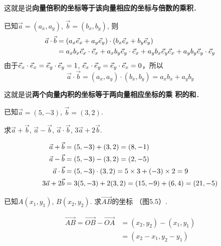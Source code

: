 这就是说\textbf{向量倍积的坐标等于该向量相应的坐标与倍数的乘积}．

已知$\vec{a}=(a_x,a_y)$, $\vec{b}=(b_x,b_y)$, 则
\[\begin{split}
    \vec{a}\cdot \vec{b}&=(a_x\vec{e}_x+a_y\vec{e}_y)\cdot (b_x\vec{e}_x+b_y\vec{e}_y)\\
    &=a_xb_x\vec{e}_x\cdot \vec{e}_x+a_xb_y\vec{e}_y\cdot \vec{e}_x+a_yb_x\vec{e}_y\vec{e}_x+a_yb_y\vec{e}_y\cdot \vec{e}_y
\end{split}\]
由于$\vec{e}_x\cdot \vec{e}_x=\vec{e}_y\cdot \vec{e}_y=1$, $\vec{e}_x\cdot \vec{e}_y=\vec{e}_y\cdot \vec{e}_x=0$，所以
\[\vec{a}\cdot \vec{b}=(a_x,a_y)\cdot (b_x,b_y)=a_xb_x+a_yb_y\]

这就是说\textbf{两个向量内积的坐标等于两向量相应坐标的乘
积的和}．

\begin{example}
    已知$\vec{a}=(5,-3)$, $\vec{b}=(3,2)$.

求$\vec{a}+\vec{b}$, $\vec{a}-\vec{b}$, $\vec{a}\cdot \vec{b}$, $3\vec{a}+2\vec{b}$.
\end{example}

\begin{solution}
\[\begin{split}
    \vec{a}+\vec{b}&=(5,-3)+(3,2)=(8,-1)\\
    \vec{a}-\vec{b}&=(5,-3)-(3,2)=(2,-5)\\
    \vec{a}\cdot \vec{b}&=(5,-3)\cdot (3,2)=5\times 3+(-3)\times2=9\\
    3\vec{a}+2\vec{b}&=3(5,-3)+2(3,2)=(15,-9)+(6,4)=(21,-5)
\end{split}\]
\end{solution}

\begin{example}
    已知$A(x_1,y_1)$, $B(x_2,y_2)$. 求$\Vec{AB}$的坐标
（图5.5）.
\end{example}

\begin{figure}[htp]
    \centering
{}
    \caption{}
\end{figure}


\begin{solution}
\[\begin{split}
    \Vec{AB}=\Vec{OB}-\Vec{OA}&=(x_2,y_2)-(x_1,y_1)\\
    &=(x_2-x_1,y_2-y_1)
\end{split}\]
\end{solution}

